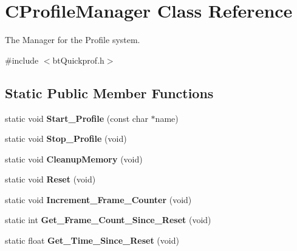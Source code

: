 \hypertarget{classCProfileManager}{}\section{C\+Profile\+Manager Class Reference}
\label{classCProfileManager}


The Manager for the Profile system.  




{\ttfamily \#include $<$bt\+Quickprof.\+h$>$}

\subsection*{Static Public Member Functions}
\begin{DoxyCompactItemize}
\item 
\mbox{\label{classCProfileManager_a9ee4ef7680a5d4244c10eb64c02fb47b}} 
static void {\bfseries Start\+\_\+\+Profile} (const char $\ast$name)
\item 
\mbox{\label{classCProfileManager_aae6ebba99caa1d89fa5a019168db2e4d}} 
static void {\bfseries Stop\+\_\+\+Profile} (void)
\item 
\mbox{\label{classCProfileManager_aad68cf5af2848a466e564ab0fe84babb}} 
static void {\bfseries Cleanup\+Memory} (void)
\item 
\mbox{\label{classCProfileManager_a945351c8b86ec458b6976a79f0ea21e7}} 
static void {\bfseries Reset} (void)
\item 
\mbox{\label{classCProfileManager_a375c7bc9c8f1ed9c9c74be7ea14c7de7}} 
static void {\bfseries Increment\+\_\+\+Frame\+\_\+\+Counter} (void)
\item 
\mbox{\label{classCProfileManager_a8d22ef534dccd484ed01838155dd6b1b}} 
static int {\bfseries Get\+\_\+\+Frame\+\_\+\+Count\+\_\+\+Since\+\_\+\+Reset} (void)
\item 
\mbox{\label{classCProfileManager_a6fee33f122aa1980191a7b6c4f6140c9}} 
static float {\bfseries Get\+\_\+\+Time\+\_\+\+Since\+\_\+\+Reset} (void)
\item 

\end{DoxyCompactItemize}
